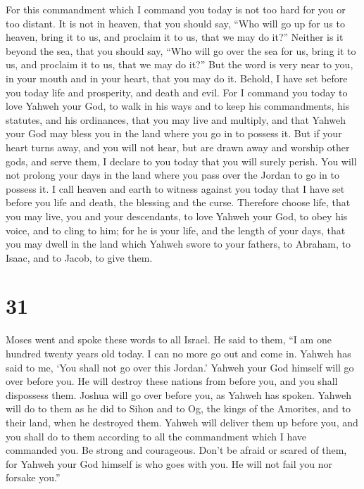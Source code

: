  For this commandment which I command you today is not too
hard for you or too distant.  It is not in heaven, that you
should say, ``Who will go up for us to heaven, bring it to us, and
proclaim it to us, that we may do it?''  Neither is it
beyond the sea, that you should say, ``Who will go over the sea for us,
bring it to us, and proclaim it to us, that we may do it?''
 But the word is very near to you, in your mouth and in
your heart, that you may do it.  Behold, I have set before
you today life and prosperity, and death and evil.  For I
command you today to love Yahweh your God, to walk in his ways and to
keep his commandments, his statutes, and his ordinances, that you may
live and multiply, and that Yahweh your God may bless you in the land
where you go in to possess it.  But if your heart turns
away, and you will not hear, but are drawn away and worship other gods,
and serve them,  I declare to you today that you will
surely perish. You will not prolong your days in the land where you pass
over the Jordan to go in to possess it.  I call heaven and
earth to witness against you today that I have set before you life and
death, the blessing and the curse. Therefore choose life, that you may
live, you and your descendants,  to love Yahweh your God,
to obey his voice, and to cling to him; for he is your life, and the
length of your days, that you may dwell in the land which Yahweh swore
to your fathers, to Abraham, to Isaac, and to Jacob, to give them.

\hypertarget{section-30}{%
\section{31}\label{section-30}}

 Moses went and spoke these words to all Israel.
 He said to them, ``I am one hundred twenty years old today.
I can no more go out and come in. Yahweh has said to me, `You shall not
go over this Jordan.'  Yahweh your God himself will go over
before you. He will destroy these nations from before you, and you shall
dispossess them. Joshua will go over before you, as Yahweh has spoken.
 Yahweh will do to them as he did to Sihon and to Og, the
kings of the Amorites, and to their land, when he destroyed them.
 Yahweh will deliver them up before you, and you shall do to
them according to all the commandment which I have commanded you.
 Be strong and courageous. Don't be afraid or scared of
them, for Yahweh your God himself is who goes with you. He will not fail
you nor forsake you.''


